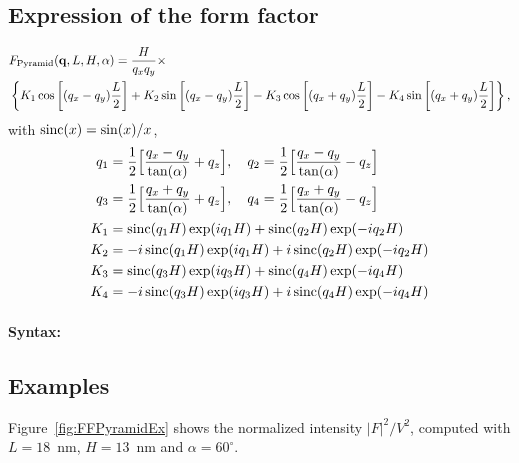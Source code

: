 \subsection{Expression of the form factor}
\begin{align*}
&F_{\rm{Pyramid}}(\mathbf{q},L, H, \alpha) =
\frac{H}{q_x q_y} \times \nonumber \\ &\left\{ K_1 \cos\left[
  (q_x-q_y)\frac{L}{2} \right] + K_2 \sin\left[ (q_x-q_y)\frac{L}{2} \right]
- K_3 \cos\left[ (q_x+q_y) \frac{L}{2} \right] - K_4 \sin\left[ (q_x+q_y)\frac{L}{2} \right]\right\},
\end{align*}
with $\operatorname{sinc}(x)=\sin(x)/x$,
\begin{align*}
       q_1 &=\frac{1}{2}\Big[\frac{q_x-q_y}{\tan(\alpha)} + q_z\Big],\quad       q_2 =\frac{1}{2}\Big[\frac{q_x-q_y}{\tan(\alpha)} - q_z\Big]\\
        q_3 &=\frac{1}{2}\Big[\frac{q_x+q_y}{\tan(\alpha)} + q_z\Big],\quad       q_4 =\frac{1}{2}\Big[\frac{q_x+q_y}{\tan(\alpha)} - q_z\Big]\\
        K_1 &= \operatorname{sinc}(q_1 H)\exp(i q_1 H)  + \operatorname{sinc}(q_2 H) \exp(-i q_2 H)\\
        K_2 &= -i \operatorname{sinc}(q_1 H) \exp(i q_1 H) +i \operatorname{sinc}(q_2 H) \exp(-i q_2 H)\\
        K_3 &= \operatorname{sinc}(q_3 H) \exp(i q_3 H)    + \operatorname{sinc}(q_4 H) \exp(-i q_4 H)\\
        K_4 &= -i \operatorname{sinc}(q_3 H) \exp(i q_3 H) + i \operatorname{sinc}(q_4 H) \exp(-i q_4 H) 
   \end{align*}

\paragraph{Syntax:}  

\subsection{Examples}
Figure~\ref{fig:FFPyramidEx} shows the normalized intensity
$|F|^2/V^2$, computed with $L=18$~nm, $H=13$~nm and
$\alpha=60^{\circ}$.

